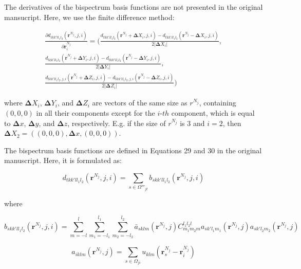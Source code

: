 \documentclass[12pt]{article}
\begin{document}
The derivatives of the bispectrum basis functions are not presented in the original mansucript. Here, we use the finite difference method:

\begin{equation}
\begin{split}
     \frac{\partial d_{tkk'l{l_1}{l_2}}(\bm r^{N_j}, j, i)}{\partial \bm r^{N_j}_i} =  
 \bigg( \frac{ d_{tkk'l{l_1}{l_2}}(\bm r^{N_j} + \bm \Delta X_i, j, i) - d_{tkk'l{l_1}{l_2}}(\bm r^{N_j} - \bm \Delta X_i, j, i) } {2 |\bm \Delta X_i|}, \\
          \frac{ d_{tkk'l{l_1}{l_2}}(\bm r^{N_j} + \bm \Delta Y_i, j, i) - d_{tkk'l{l_1}{l_2}}(\bm r^{N_j} - \bm \Delta Y_i, j, i) } {2 |\bm \Delta Y_i|},\\
          \frac{ d_{tkk'l{l_1}{l_2}, j, i}(\bm r^{N_j} + \bm \Delta Z_i, j, i) - d_{tkk'l{l_1}{l_2}, j, i}(\bm r^{N_j} - \bm \Delta Z_i, j, i) } {2 |\bm \Delta Z_i|} \bigg)
\end{split}
\end{equation}

where $\bm \Delta X_i$, $\bm \Delta Y_i$, and $\bm \Delta Z_i$ are vectors of the same size as $r^{N_j}$, containing $(0,0,0)$ in all their components except for the $i$-$th$ component, which is equal to $\bm \Delta x$, $\bm \Delta y$, and $\bm \Delta z$, respectively. E.g. if the size of $r^{N_j}$ is $3$ and $i = 2$, then $\bm \Delta X_2 = ( (0,0,0), \bm \Delta x, (0,0,0))$.

The bispectrum basis functions are defined in Equations 29 and 30 in the original manuscript. Here, it is formulated as:

\begin{equation}
    \label{eq:derd}
    d_{tkk'l{l_1}{l_2}}(\bm r^{N_j}, j, i) = \sum_{s \in \Omega'''_{jt}} b_{skk'l{l_1}{l_2}}(\bm r^{N_j}, j, i)
\end{equation}

where 

\begin{equation}
    b_{skk'l{l_1}{l_2}}(\bm r^{N_j}, j, i) = 
     \sum_{m=-l}^l
     \sum_{m_1=-{l_1}}^{l_1}
     \sum_{m_2=-l_2}^{l_2}
     \bar{a}_{sklm}(\bm r^{N_j}, j)
     C_{{m_1}{m_2}m}^{{l_1}{l_2}l}
     a_{sk'{l_1}{m_1}}(\bm r^{N_j}, j)
     a_{sk'{l_2}{m_2}}(\bm r^{N_j}, j)
\end{equation}

\begin{equation}
    a_{iklm}(\bm r^{N_j}, j) = \sum_{s \in \Omega_{ji}} u_{klm}(\bm r^{N_j}_s -\bm r^{N_j}_i)
\end{equation}
\end{document}
